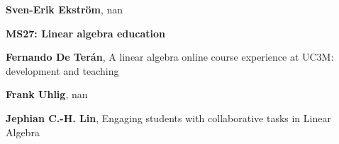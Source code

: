 \documentclass[ILAS2025-program.tex]{subfiles}
\begin{document}
\begin{description}
\begin{description}
        \item[] \textbf{Sven-Erik Ekström}, nan
        \end{description}
    \begin{description}
    \item[] {\color{mstitle}\textbf{MS27: Linear algebra education}} 
    \item[] \textbf{Fernando De Terán}, A linear algebra online course experience at UC3M: development and teaching
        \item[] \textbf{Frank Uhlig}, nan
        \item[] \textbf{Jephian C.-H. Lin}, Engaging students with collaborative tasks in Linear Algebra


\end{description}
\end{description}
\end{document}
